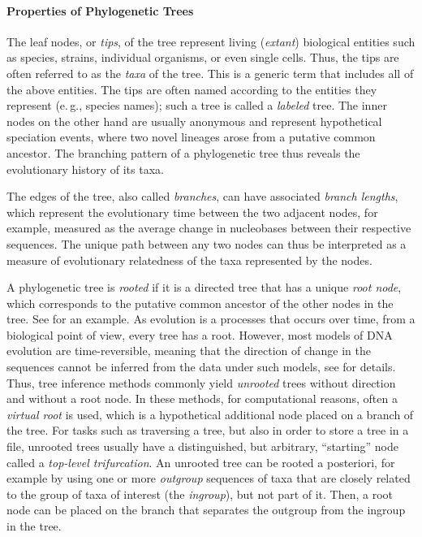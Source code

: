 \paragraph{Properties of Phylogenetic Trees}
\label{ch:Foundations:sec:TreeOfLife:sub:PhylogeneticTrees:par:TreeProperties}

The leaf nodes, or \emph{tips}, of the tree represent living (\emph{extant}) biological entities
such as species, strains, individual organisms, or even single cells. %
Thus, the tips are often referred to as the \emph{taxa} of the tree.
This is a generic term that includes all of the above entities.
The tips are often named according to the entities they represent (e.\,g., species names);
such a tree is called a \emph{labeled} tree.
The inner nodes on the other hand are usually anonymous and
represent hypothetical speciation events, where two novel lineages arose from a putative common ancestor.
The branching pattern of a phylogenetic tree thus reveals the evolutionary history of its taxa.

The edges of the tree, also called \emph{branches}, can have associated \emph{branch lengths},
which represent the evolutionary time between the two adjacent nodes,
for example, measured as the average change in nucleobases between their respective sequences.
The unique path between any two nodes can thus be interpreted
as a measure of evolutionary relatedness of the taxa represented by the nodes.

A phylogenetic tree is \emph{rooted}
if it is a directed tree that has a unique \emph{root node},
which corresponds to the putative common ancestor of the other nodes in the tree.
See  for an example.
As evolution is a processes that occurs over time,
from a biological point of view, every tree has a root.
However, most models of DNA evolution are time-reversible,
meaning that the direction of change in the sequences cannot be inferred from the data under such models,
see  for details.
Thus, tree inference methods commonly yield \emph{unrooted} trees without direction and without a root node.
In these methods, for computational reasons, often a \emph{virtual root} is used,
which is a hypothetical additional node placed on a branch of the tree.
For tasks such as traversing a tree, but also in order to store a tree in a file,
unrooted trees usually have a distinguished, but arbitrary, ``starting'' node called a \emph{top-level trifurcation}.
An unrooted tree can be rooted a posteriori, for example by using one or more \emph{outgroup} sequences of taxa
that are closely related to the group of taxa of interest (the \emph{ingroup}), but not part of it.
Then, a root node can be placed on the branch that separates the outgroup from the ingroup in the tree.

